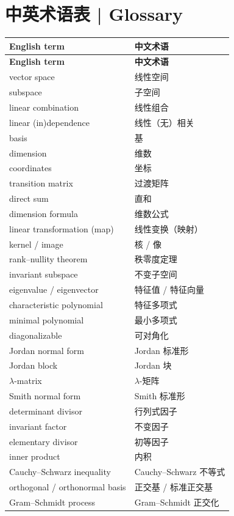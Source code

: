 \documentclass[UTF8,11pt,a4paper]{ctexart}
\begin{document}
\section*{中英术语表 | Glossary}
\begingroup
\setlength{\tabcolsep}{6pt}
\begin{longtable}{@{}p{}p{}@{}}
\toprule
\textbf{English term} & \textbf{中文术语}\\
\midrule
\endfirsthead
\toprule
\textbf{English term} & \textbf{中文术语}\\
\midrule
\endhead
vector space & 线性空间\\
subspace & 子空间\\
linear combination & 线性组合\\
linear (in)dependence & 线性（无）相关\\
basis & 基\\
dimension & 维数\\
coordinates & 坐标\\
transition matrix & 过渡矩阵\\
direct sum & 直和\\
dimension formula & 维数公式\\
linear transformation (map) & 线性变换（映射）\\
kernel / image & 核 / 像\\
rank--nullity theorem & 秩零度定理\\
invariant subspace & 不变子空间\\
eigenvalue / eigenvector & 特征值 / 特征向量\\
characteristic polynomial & 特征多项式\\
minimal polynomial & 最小多项式\\
diagonalizable & 可对角化\\
Jordan normal form & Jordan 标准形\\
Jordan block & Jordan 块\\
$\lambda$-matrix & $\lambda$-矩阵\\
Smith normal form & Smith 标准形\\
determinant divisor & 行列式因子\\
invariant factor & 不变因子\\
elementary divisor & 初等因子\\
inner product & 内积\\
Cauchy--Schwarz inequality & Cauchy--Schwarz 不等式\\
orthogonal / orthonormal basis & 正交基 / 标准正交基\\
Gram--Schmidt process & Gram--Schmidt 正交化\\

\end{longtable}
\end{document}
